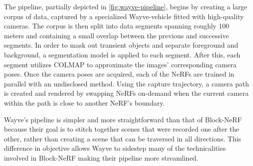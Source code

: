 The pipeline, partially depicted in \autoref{fig:wayve-pipeline}, begins by creating a large corpus of data, captured by a specialized Wayve-vehicle fitted with high-quality cameras. The corpus is then split into data segments spanning roughly 100 meters and containing a small overlap between the previous and successive segments. In order to mask out transient objects and separate foreground and background, a segmentation model is applied to each segment. After this, each segment utilizes COLMAP to approximate the images' corresponding camera poses. Once the camera poses are acquired, each of the NeRFs are trained in parallel with an undisclosed method. Using the capture trajectory, a camera path is created and rendered by swapping NeRFs on-demand when the current camera within the path is close to another NeRF's boundary. 



Wayve's pipeline is simpler and more straightforward than that of Block-NeRF because their goal is to stitch together scenes that were recorded one after the other, rather than creating a scene that can be traversed in all directions. This difference in objective allows Wayve to sidestep many of the technicalities involved in Block-NeRF making their pipeline more streamlined.